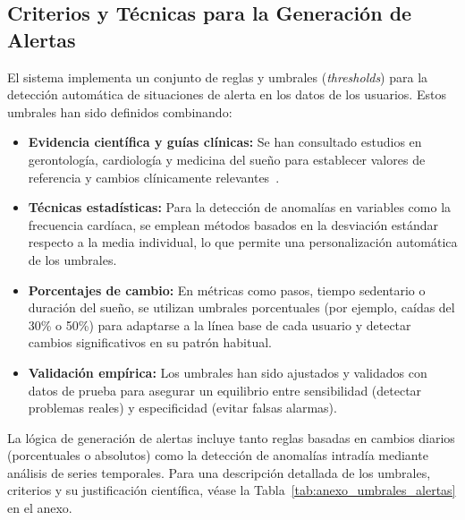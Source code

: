 \subsection{Criterios y Técnicas para la Generación de Alertas}
El sistema implementa un conjunto de reglas y umbrales (\textit{thresholds}) para la detección automática de situaciones de alerta en los datos de los usuarios. Estos umbrales han sido definidos combinando:

\begin{itemize}
    \item \textbf{Evidencia científica y guías clínicas:} Se han consultado estudios en gerontología, cardiología y medicina del sueño para establecer valores de referencia y cambios clínicamente relevantes~\cite{Smith2019, Owen2020, Irwin2015}.
    \item \textbf{Técnicas estadísticas:} Para la detección de anomalías en variables como la frecuencia cardíaca, se emplean métodos basados en la desviación estándar respecto a la media individual, lo que permite una personalización automática de los umbrales.
    \item \textbf{Porcentajes de cambio:} En métricas como pasos, tiempo sedentario o duración del sueño, se utilizan umbrales porcentuales (por ejemplo, caídas del 30\% o 50\%) para adaptarse a la línea base de cada usuario y detectar cambios significativos en su patrón habitual.
    \item \textbf{Validación empírica:} Los umbrales han sido ajustados y validados con datos de prueba para asegurar un equilibrio entre sensibilidad (detectar problemas reales) y especificidad (evitar falsas alarmas).
\end{itemize}

La lógica de generación de alertas incluye tanto reglas basadas en cambios diarios (porcentuales o absolutos) como la detección de anomalías intradía mediante análisis de series temporales. Para una descripción detallada de los umbrales, criterios y su justificación científica, véase la Tabla~\ref{tab:anexo_umbrales_alertas} en el anexo.
